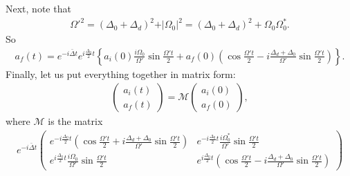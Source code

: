 \documentclass{article}
\begin{document}
Next, note that
\begin{align}
\Omega'^2 = (\Delta_0 + \Delta_d)^2 + \vert\Omega_0\vert^2 = (\Delta_0 + \Delta_d)^2 + \Omega_0\Omega^*_0.
\end{align}
So
\begin{align}
\boxed{a_f(t) = e^{-i\bar{\Delta}t}e^{i\frac{\Delta_0}{2}t}\left\{
a_i(0)\frac{i\Omega_0}{\Omega'}\sin\frac{\Omega't}{2} + 
a_f(0)\left(\cos\frac{\Omega't}{2}-i\frac{\Delta_d + \Delta_0}{\Omega'}\sin\frac{\Omega't}{2} \right)  \right\}}.
\end{align}
Finally, let us put everything together in matrix form:
\begin{align}
\begin{pmatrix}
a_i(t)\\a_f(t)
\end{pmatrix} = 
\mathcal{M}\begin{pmatrix}
a_i(0)\\a_f(0)
\end{pmatrix},
\end{align}
where $\mathcal{M}$ is the matrix
\begin{align}
\boxed{e^{-i\bar{\Delta}t}
\begin{pmatrix}
e^{-i\frac{\Delta_0}{2}t}\left(\cos\frac{\Omega't}{2} + i\frac{\Delta_d + \Delta_0}{\Omega'}\sin\frac{\Omega't}{2} \right) & e^{-i\frac{\Delta_0}{2}t}\frac{i\Omega^*_0}{\Omega'}\sin\frac{\Omega't}{2}\\
e^{i\frac{\Delta_0}{2}t}\frac{i\Omega_0}{\Omega'}\sin\frac{\Omega't}{2} & e^{i\frac{\Delta_0}{2}t}\left(\cos\frac{\Omega't}{2}-i\frac{\Delta_d + \Delta_0}{\Omega'}\sin\frac{\Omega't}{2} \right)
\end{pmatrix}}
\end{align}
\end{document}
